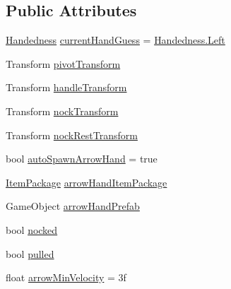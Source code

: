 \subsection*{Public Attributes}
\begin{DoxyCompactItemize}
\item 
\mbox{\hyperlink{class_valve_1_1_v_r_1_1_interaction_system_1_1_longbow_a1a13793c73b85cc47cc323af991169be}{Handedness}} \mbox{\hyperlink{class_valve_1_1_v_r_1_1_interaction_system_1_1_longbow_a50efe1398921e159ce3e7a3ddd228799}{current\+Hand\+Guess}} = \mbox{\hyperlink{class_valve_1_1_v_r_1_1_interaction_system_1_1_longbow_a1a13793c73b85cc47cc323af991169bea945d5e233cf7d6240f6b783b36a374ff}{Handedness.\+Left}}
\item 
Transform \mbox{\hyperlink{class_valve_1_1_v_r_1_1_interaction_system_1_1_longbow_af757d0d80234138d49f593282fcb9da9}{pivot\+Transform}}
\item 
Transform \mbox{\hyperlink{class_valve_1_1_v_r_1_1_interaction_system_1_1_longbow_ad3a312a36990ee4d3b312cece61c8de3}{handle\+Transform}}
\item 
Transform \mbox{\hyperlink{class_valve_1_1_v_r_1_1_interaction_system_1_1_longbow_a0a9ebd634ee05177f21171a32fb1e525}{nock\+Transform}}
\item 
Transform \mbox{\hyperlink{class_valve_1_1_v_r_1_1_interaction_system_1_1_longbow_a439ae7b21f5baefc78053bd32de81404}{nock\+Rest\+Transform}}
\item 
bool \mbox{\hyperlink{class_valve_1_1_v_r_1_1_interaction_system_1_1_longbow_af05bb2dbf9bc54f282088d4d2a4753ca}{auto\+Spawn\+Arrow\+Hand}} = true
\item 
\mbox{\hyperlink{class_valve_1_1_v_r_1_1_interaction_system_1_1_item_package}{Item\+Package}} \mbox{\hyperlink{class_valve_1_1_v_r_1_1_interaction_system_1_1_longbow_acf32893c0d8d9925bccb4a6369b68144}{arrow\+Hand\+Item\+Package}}
\item 
Game\+Object \mbox{\hyperlink{class_valve_1_1_v_r_1_1_interaction_system_1_1_longbow_aaab9d5480bf1f4acb18da7cf3cb91b0a}{arrow\+Hand\+Prefab}}
\item 
bool \mbox{\hyperlink{class_valve_1_1_v_r_1_1_interaction_system_1_1_longbow_a3a0cb07c85c95fa3d052d45dcfa5ca8a}{nocked}}
\item 
bool \mbox{\hyperlink{class_valve_1_1_v_r_1_1_interaction_system_1_1_longbow_aef7ba1ecd690e0a7e432df432a5bfeb4}{pulled}}
\item 
float \mbox{\hyperlink{class_valve_1_1_v_r_1_1_interaction_system_1_1_longbow_a9dc4e4aecaa9b346be14cb381aa56158}{arrow\+Min\+Velocity}} = 3f

\end{DoxyCompactItemize}
